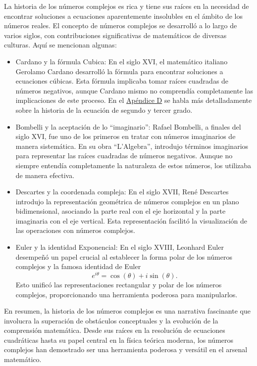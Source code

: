 La historia de los números complejos es rica y tiene sus raíces en la necesidad de encontrar soluciones a ecuaciones aparentemente insolubles en el ámbito de los números reales. El concepto de números complejos se desarrolló a lo largo de varios siglos, con contribuciones significativas de matemáticos de diversas culturas. Aquí se mencionan algunas:
\begin{itemize}
    \item Cardano y la fórmula Cubica: En el siglo XVI, el matemático italiano Gerolamo Cardano desarrolló la fórmula para encontrar soluciones a ecuaciones cúbicas. Esta fórmula implicaba tomar raíces cuadradas de números negativos, aunque Cardano mismo no comprendía completamente las implicaciones de este proceso. En el \hyperref[sec:radical]{Apéndice D} se habla más detalladamente sobre la historia de la ecuación de segundo y tercer grado.
    \item Bombelli y la aceptación de lo “imaginario”: Rafael Bombelli, a finales del siglo XVI, fue uno de los primeros en tratar con números imaginarios de manera sistemática. En su obra “L'Algebra”, introdujo términos imaginarios para representar las raíces cuadradas de números negativos. Aunque no siempre entendía completamente la naturaleza de estos números, los utilizaba de manera efectiva.
    \item Descartes y la coordenada compleja: En el siglo XVII, René Descartes introdujo la representación geométrica de números complejos en un plano bidimensional, asociando la parte real con el eje horizontal y la parte imaginaria con el eje vertical. Esta representación facilitó la visualización de las operaciones con números complejos.
    \item Euler y la identidad Exponencial: En el siglo XVIII, Leonhard Euler desempeñó un papel crucial al establecer la forma polar de los números complejos y la famosa identidad de Euler
    \[e^{i\theta} = \cos(\theta) + i\sin(\theta).\]
    Esto unificó las representaciones rectangular y polar de los números complejos, proporcionando una herramienta poderosa para manipularlos.
\end{itemize}

En resumen, la historia de los números complejos es una narrativa fascinante que involucra la superación de obstáculos conceptuales y la evolución de la comprensión matemática. Desde sus raíces en la resolución de ecuaciones cuadráticas hasta su papel central en la física teórica moderna, los números complejos han demostrado ser una herramienta poderosa y versátil en el arsenal matemático.

